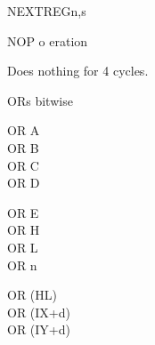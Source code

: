 \begin{basedescript}{
	\desclabelstyle{\multilinelabel}
	\desclabelwidth{3cm}}
\begin{DetailItem}{NEXTREG}{n,s\ZXN}
	\end{DetailItem}

	\pagebreak


	\begin{DetailItem}{NOP}{}
		{o eration}
		{}

		Does nothing for 4 cycles.
		
		\begin{DetailEffects}
			\FlagsNOP
		\end{DetailEffects}
						
		\begin{DetailTiming}
		\end{DetailTiming}

	\end{DetailItem}


	\begin{DetailItem}{OR}{s}
		{bitwise }
		{}

		\begin{DetailVariants}[4]
			OR A\\
			OR B\\
			OR C\\
			OR D

			\columnbreak
			OR E\\
			OR H\\
			OR L\\
			OR n

			\columnbreak
			OR (HL)\\
			OR (IX+d)\\
			OR (IY+d)


\end{DetailVariants}
\end{DetailItem}
\end{basedescript}

